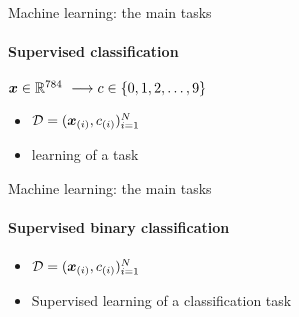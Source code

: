 \begin{frame}{Machine learning: the main tasks}
  \framesubtitle{Supervised classification}
  \begin{center}
    $\boldsymbol{x} \in \mathbb{R}^{784} \ \longrightarrow {c}  \in\{0, 1,2, \ldots ,9
    \}$
  \end{center}
  \begin{itemize}
  \item $\mathcal{D}= (\boldsymbol{x}_{(i)} , {c}_{(i)} )_{i=1}^{N}$ 
  \item {} learning of a  task
  \end{itemize}
\end{frame}

\begin{frame}{Machine learning: the main tasks}
  \framesubtitle{Supervised binary classification}
  \begin{center}
  \end{center}

  \begin{itemize}
  \item $\mathcal{D}= (\boldsymbol{x}_{(i)} , {c}_{(i)} )_{i=1}^{N}$ 
  \item Supervised learning of a  classification task
  \end{itemize}

\end{frame}


